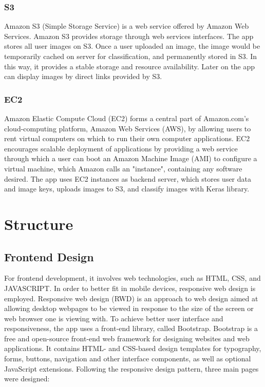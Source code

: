 \documentclass[conference]{IEEEtran}
\begin{document}
\subsubsection{S3}
Amazon S3 (Simple Storage Service) is a web service offered by Amazon Web Services. Amazon S3 provides storage through web services interfaces.\cite{wiki:s3} The app stores all user images on S3. Once a user uploaded an image, the image would be temporarily cached on server for classification, and permanently stored in S3. In this way, it provides a stable storage and resource availability. Later on the app can display images by direct links provided by S3.

\subsubsection{EC2}
Amazon Elastic Compute Cloud (EC2) forms a central part of Amazon.com's cloud-computing platform, Amazon Web Services (AWS), by allowing users to rent virtual computers on which to run their own computer applications. EC2 encourages scalable deployment of applications by providing a web service through which a user can boot an Amazon Machine Image (AMI) to configure a virtual machine, which Amazon calls an "instance", containing any software desired.\cite{wiki:ec2} The app uses EC2 instances as backend server, which stores user data and image keys, uploads images to S3, and classify images with Keras library.

\section{Structure}

\subsection{Frontend Design}
For frontend development, it involves web technologies, such as HTML, CSS, and JAVASCRIPT. In order to better fit in mobile devices, responsive web design is employed. Responsive web design (RWD) is an approach to web design aimed at allowing desktop webpages to be viewed in response to the size of the screen or web browser one is viewing with.\cite{wiki:rwd} To achieve better user interface and responsiveness, the app uses a front-end library, called Bootstrap. Bootstrap is a free and open-source front-end web framework for designing websites and web applications. It contains HTML- and CSS-based design templates for typography, forms, buttons, navigation and other interface components, as well as optional JavaScript extensions.\cite{wiki:bootstrap} Following the responsive design pattern, three main pages were designed:
\end{document}
